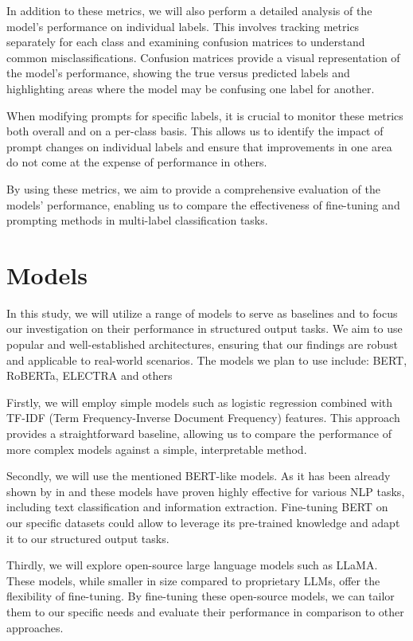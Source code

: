 \documentclass[11pt]{article}
\begin{document}
In addition to these metrics, we will also perform a detailed analysis of the model’s performance on individual labels. This involves tracking metrics separately for each class and examining confusion matrices to understand common misclassifications. Confusion matrices provide a visual representation of the model’s performance, showing the true versus predicted labels and highlighting areas where the model may be confusing one label for another.

When modifying prompts for specific labels, it is crucial to monitor these metrics both overall and on a per-class basis. This allows us to identify the impact of prompt changes on individual labels and ensure that improvements in one area do not come at the expense of performance in others.

By using these metrics, we aim to provide a comprehensive evaluation of the models’ performance, enabling us to compare the effectiveness of fine-tuning and prompting methods in multi-label classification tasks.

\section{Models} 

In this study, we will utilize a range of models to serve as baselines and to focus our investigation on their performance in structured output tasks. We aim to use popular and well-established architectures, ensuring that our findings are robust and applicable to real-world scenarios. The models we plan to use include: BERT, RoBERTa, ELECTRA and others 

Firstly, we will employ simple models such as logistic regression combined with TF-IDF (Term Frequency-Inverse Document Frequency) features. This approach provides a straightforward baseline, allowing us to compare the performance of more complex models against a simple, interpretable method.

Secondly, we will use the mentioned BERT-like models. As it has been already shown by in \cite{springer} and \cite{arxiv1} these models have proven highly effective for various NLP tasks, including text classification and information extraction. Fine-tuning BERT on our specific datasets could allow to leverage its pre-trained knowledge and adapt it to our structured output tasks.

Thirdly, we will explore open-source large language models such as LLaMA. These models, while smaller in size compared to proprietary LLMs, offer the flexibility of fine-tuning. By fine-tuning these open-source models, we can tailor them to our specific needs and evaluate their performance in comparison to other approaches.
\end{document}

